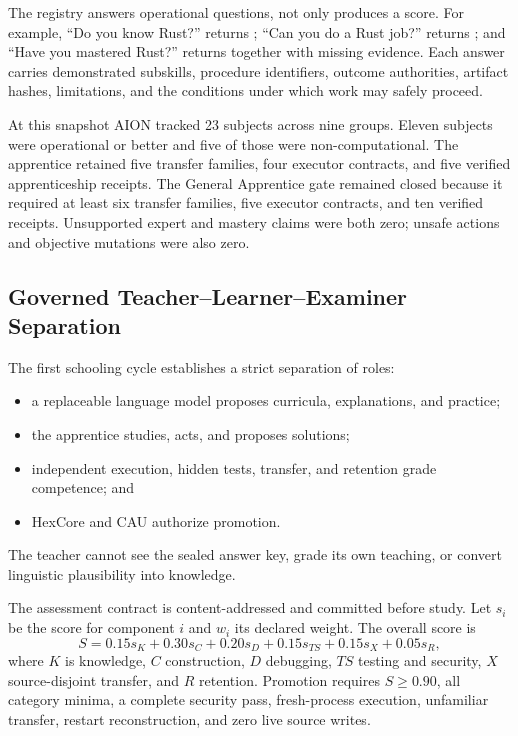 The registry answers operational questions, not only produces a score.  For
example, ``Do you know Rust?'' returns ; ``Can you do a Rust
job?'' returns ; and ``Have you mastered Rust?'' returns
 together with missing evidence.  Each answer carries demonstrated
subskills, procedure identifiers, outcome authorities, artifact hashes,
limitations, and the conditions under which work may safely proceed.

At this snapshot AION tracked 23 subjects across nine groups.  Eleven subjects
were operational or better and five of those were non-computational.  The
apprentice retained five transfer families, four executor contracts, and five
verified apprenticeship receipts.  The General Apprentice gate remained closed
because it required at least six transfer families, five executor contracts,
and ten verified receipts.  Unsupported expert and mastery claims were both
zero; unsafe actions and objective mutations were also zero.

\subsection{Governed Teacher--Learner--Examiner Separation}
\label{subsec:governed-teacher-examiner}

The first schooling cycle establishes a strict separation of roles:
\begin{itemize}[leftmargin=1.6em]
    \item a replaceable language model proposes curricula, explanations, and
          practice;
    \item the apprentice studies, acts, and proposes solutions;
    \item independent execution, hidden tests, transfer, and retention grade
          competence; and
    \item HexCore and CAU authorize promotion.
\end{itemize}
The teacher cannot see the sealed answer key, grade its own teaching, or convert
linguistic plausibility into knowledge.

The assessment contract is content-addressed and committed before study.  Let
$s_i$ be the score for component $i$ and $w_i$ its declared weight.  The
overall score is
\begin{equation}
S=0.15s_{K}+0.30s_{C}+0.20s_{D}+0.15s_{TS}
  +0.15s_{X}+0.05s_{R},
\label{eq:python-assessment-weighting}
\end{equation}
where $K$ is knowledge, $C$ construction, $D$ debugging, $TS$ testing and
security, $X$ source-disjoint transfer, and $R$ retention.  Promotion requires
$S\geq0.90$, all category minima, a complete security pass, fresh-process
execution, unfamiliar transfer, restart reconstruction, and zero live source
writes.


